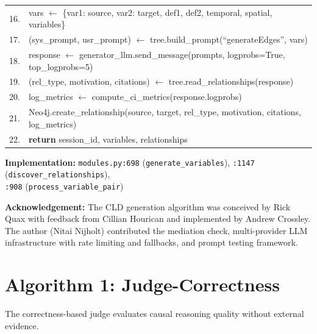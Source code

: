 \begin{table}[H]
\begin{tabular}{@{}r l@{}}
16. & \quad vars $\leftarrow$ \{var1: source, var2: target, def1, def2, temporal, spatial, variables\} \\
17. & \quad (sys\_prompt, usr\_prompt) $\leftarrow$ tree.build\_prompt(``generateEdges'', vars) \\
18. & \quad response $\leftarrow$ generator\_llm.send\_message(prompts, logprobs=True, top\_logprobs=5) \\
19. & \quad (rel\_type, motivation, citations) $\leftarrow$ tree.read\_relationships(response) \\
20. & \quad log\_metrics $\leftarrow$ compute\_ci\_metrics(response.logprobs) \\
21. & \quad Neo4j.create\_relationship(source, target, rel\_type, motivation, citations, log\_metrics) \\
22. & \textbf{return} session\_id, variables, relationships \\
\bottomrule
\end{tabular}
\end{table}

\noindent\textbf{Implementation:} \texttt{modules.py:698} (\texttt{generate\_variables}), \texttt{:1147} (\texttt{discover\_relationships}),\\ \texttt{:908} (\texttt{process\_variable\_pair})

\noindent\textbf{Acknowledgement:} The CLD generation algorithm was conceived by Rick Quax with feedback from Cillian Hourican and implemented by Andrew Crossley. The author (Nitai Nijholt) contributed the mediation check, multi-provider LLM infrastructure with rate limiting and fallbacks, and prompt testing framework.

\section{Algorithm 1: Judge-Correctness}
\label{alg:judge_correctness}

The correctness-based judge evaluates causal reasoning quality without external evidence.


